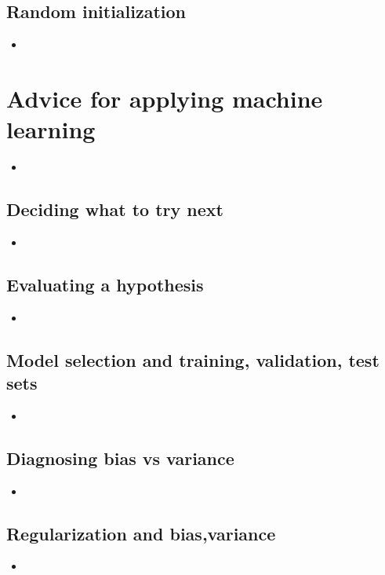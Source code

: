 \documentclass[13pt]{book}
\begin{document}
\section{Random initialization}
\begin{itemize}
  \item
\end{itemize}

\chapter{Advice for applying machine learning}
\begin{itemize}
  \item
\end{itemize}

\section{Deciding what to try next}
\begin{itemize}
  \item
\end{itemize}

\section{Evaluating a hypothesis}
\begin{itemize}
  \item
\end{itemize}

\section{Model selection and training, validation, test sets}
\begin{itemize}
  \item
\end{itemize}

\section{Diagnosing bias vs variance}
\begin{itemize}
  \item
\end{itemize}

\section{Regularization and bias,variance}
\begin{itemize}
  \item
\end{itemize}
\end{document}
